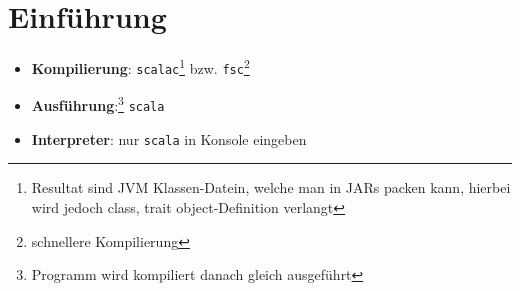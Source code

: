 \newcommand{\home}{../../latex/styles} %















%





\section{Einführung}
\begin{itemize}
  \item \textbf{Kompilierung}: \texttt{scalac}\footnote{Resultat sind JVM
  Klassen-Datein, welche man in JARs packen kann, hierbei wird jedoch class,
  trait \oder object-Definition verlangt} bzw. 
  \texttt{fsc}\footnote{schnellere Kompilierung}
  \item \textbf{Ausführung}:\footnote{Programm wird kompiliert \und danach
  gleich ausgeführt} \texttt{scala}
  \item \textbf{Interpreter}: nur \texttt{scala} in Konsole eingeben
\end{itemize}



